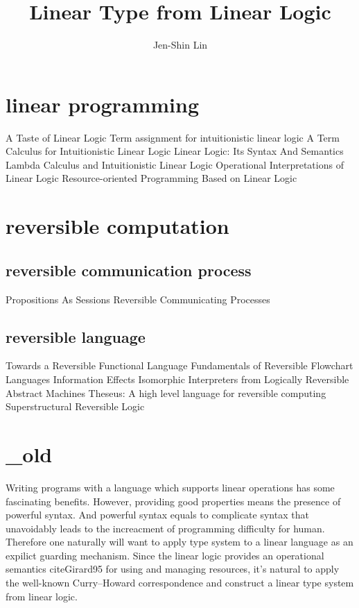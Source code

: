 \documentclass[a4paper,twocolumn]{article}
\title{Linear Type from Linear Logic}
\author{Jen-Shin Lin}
\begin{document}
\maketitle

\section{linear programming}

   \cite{Wadler93}
      A Taste of Linear Logic
   \cite{Benton92}
      Term assignment for intuitionistic linear logic
   \cite{Benton93}
      A Term Calculus for Intuitionistic Linear Logic
   \cite{Girard95}
      Linear Logic: Its Syntax And Semantics
   \cite{Ronchi94}
      Lambda Calculus and Intuitionistic Linear Logic
   \cite{Turner98}
      Operational Interpretations of Linear Logic
   \cite{Novitzka07}
      Resource-oriented Programming Based on Linear Logic

\section{reversible computation}

\subsection{reversible communication process}

   \cite{Wadler12}
      Propositions As Sessions
   \cite{Brown16}
      Reversible Communicating Processes

\subsection{reversible language}

   \cite{Yokoyama11}
      Towards a Reversible Functional Language
   \cite{Yokoyama16}
      Fundamentals of Reversible Flowchart Languages
   \cite{James12}
      Information Effects
   \cite{James13}
      Isomorphic Interpreters from Logically Reversible Abstract Machines
   \cite{James14}
      Theseus: A high level language for reversible computing
   \cite{Sparks14}
      Superstructural Reversible Logic



\section{\_old}


Writing programs with a language which supports linear operations has some fascinating benefits. However, providing good properties means the presence of powerful syntax. And powerful syntax equals to complicate syntax that unavoidably leads to the increacment of programming difficulty for human. Therefore one naturally will want to apply type system to a linear language as an expilict guarding mechanism. Since the linear logic provides an operational semantics cite{Girard95} for using and managing resources, it's natural to apply the well-known Curry–Howard correspondence and construct a linear type system from linear logic.
\end{document}
